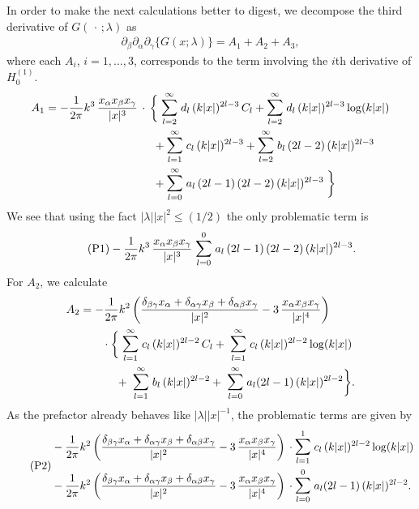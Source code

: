 In order to make the next calculations better to digest, we decompose the third derivative of $G(\,\cdot\, ; \lambda)$ as 
\begin{align*}
  \partial_\beta \partial_\alpha \partial_\gamma \big\{G(x; \lambda)\big\}
  = A_1 + A_2 + A_3,
\end{align*}
where each $A_i$, $i = 1,\dots,3$, corresponds to the term involving the $i$th derivative of $H_0^{(1)}$.
\begin{align*}
  A_1 = - \frac{1}{2 \pi } k^3 \, \frac{x_\alpha x_\beta x_\gamma}{|x|^3}  \,
  &\cdot\,\bigg\{
     \; \mathlarger{\sum}_{l = 2}^\infty \; d_l \, (k|x|)^{2l - 3} \, C_l +  \mathlarger{\sum}_{l = 2}^\infty \; d_l \, (k|x|)^{2l - 3} \log(k|x|)  \\
  &\quad\,  +  \mathlarger{\sum}_{l = 1}^\infty \; c_l \, (k|x|)^{2l - 3} +  \mathlarger{\sum}_{l = 2}^\infty \; b_l\, (2l - 2) \, (k|x|)^{2l - 3} \\
  &\quad\, +  \mathlarger{\sum}_{l = 0}^\infty \; a_l \, (2l - 1)\, (2l - 2) \, (k|x|)^{2l - 3} \;
  \bigg\}
\end{align*}
We see that using the fact $|\lambda| |x|^2 \leq (1/2)$ the only problematic term is
\begin{align}
  \label{eq:P1}
  \tag{P1}- \frac{1}{2 \pi } k^3\, \frac{x_\alpha x_\beta x_\gamma}{|x|^3}  \; \mathlarger{\sum}_{l = 0}^{0} \; a_l \, (2l - 1)\, (2l - 2) \, (k|x|)^{2l - 3} .
\end{align}
For $A_2$, we calculate
\begin{align*}
  A_2 &= - \frac{1}{2\pi} k^2\, \bigg(\frac{\delta_{\beta\gamma} x_\alpha + \delta_{\alpha \gamma} x_\beta + \delta_{\alpha \beta} x_\gamma}{|x|^2} - 3\, \frac{x_\alpha x_\beta x_\gamma}{|x|^4} \bigg) \\ 
  &\qquad \cdot 
  \bigg\{
    \; \mathlarger{\sum}_{l = 1}^\infty \; c_l \, (k|x|)^{2l - 2} \, C_l 
  + \; \mathlarger{\sum}_{l = 1}^\infty \; c_l \, (k|x|)^{2l - 2} \log(k|x|) \\
  &\qquad\quad\,+ \; \mathlarger{\sum}_{l = 1}^\infty \; b_l \, (k|x|)^{2l - 2} 
  + \; \mathlarger{\sum}_{l = 0}^\infty \; a_l (2l - 1) \, (k|x|)^{2l - 2} 
  \bigg\}.
\end{align*}
As the prefactor already behaves like $|\lambda| |x|^{-1}$, the problematic terms are given by
\begin{align}
  \label{eq:P2}
  \tag{P2}
  \begin{alignedat}{1}
  & - \frac{1}{2\pi} k^2\, \bigg(\frac{\delta_{\beta\gamma} x_\alpha + \delta_{\alpha \gamma} x_\beta + \delta_{\alpha \beta} x_\gamma}{|x|^2} - 3\, \frac{x_\alpha x_\beta x_\gamma}{|x|^4} \bigg) 
   \, \cdot \mathlarger{\sum}_{l = 1}^1 \; c_l \, (k|x|)^{2l - 2} \log(k|x|) \\
   &- \frac{1}{2\pi} k^2 \,\bigg(\frac{\delta_{\beta\gamma} x_\alpha + \delta_{\alpha \gamma} x_\beta + \delta_{\alpha \beta} x_\gamma}{|x|^2} - 3\, \frac{x_\alpha x_\beta x_\gamma}{|x|^4} \bigg) 
  \, \cdot \mathlarger{\sum}_{l = 0}^0 \; a_l (2l - 1) \, (k|x|)^{2l - 2} .
  \end{alignedat}
\end{align}
